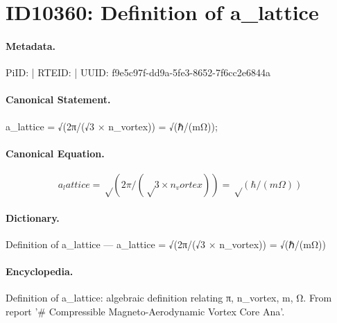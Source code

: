 \section*{ID10360: Definition of a\_lattice}
\paragraph{Metadata.}
PiID:  | RTEID:  | UUID: f9e5c97f-dd9a-5fe3-8652-7f6cc2e6844a

\paragraph{Canonical Statement.}
a\_lattice = √(2π/(√3 × n\_vortex)) = √(ℏ/(mΩ));

\paragraph{Canonical Equation.}
\[
a_lattice = √(2π/(√3 × n_vortex)) = √(ℏ/(mΩ))
\]

\paragraph{Dictionary.}
Definition of a\_lattice — a\_lattice = √(2π/(√3 × n\_vortex)) = √(ℏ/(mΩ))

\paragraph{Encyclopedia.}
Definition of a\_lattice: algebraic definition relating π, n\_vortex, m, Ω. From report '\# Compressible Magneto-Aerodynamic Vortex Core Ana'.
